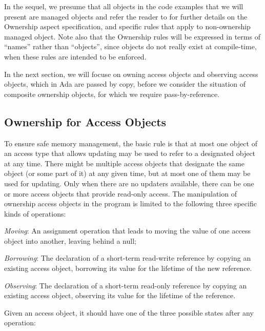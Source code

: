 \documentclass{llncs}
\begin{document}
In the sequel, we presume that all objects in the code examples that we will present are managed objects and refer the reader to \cite{AI2017} for further details on
the Ownership aspect specification, and specific rules that apply to non-ownership managed object. Note also that the Ownership rules will be expressed in terms
of ``names'' rather than ``objects'', since objects do not really exist at compile-time, when these rules are intended to be enforced. 

In the next section, we will focuse on owning access objects and observing access objects, which in Ada are passed by copy, before we
consider the situation of composite ownership objects, for which we require pass-by-reference.


\subsection{Ownership for Access Objects}
\label{subsec:ownershipAccess}

To ensure safe memory management, the basic rule is that at most one object of an access type that allows updating may be used to refer to a designated object at any time.  There might be multiple access objects that designate the same object (or some part of it) at any given time, but at most one of them may be used for updating.  Only when there are no updaters available, there can be one or more access objects that provide read-only access. The manipulation of ownership access objects in the program is limited to the following three specific kinds of operations:

\begin{compactitem}
  \item \textit{Moving}: An assignment operation that leads to moving the value of one access object into another, leaving behind a null;
  \item \textit{Borrowing}: The declaration of a short-term read-write reference by copying an existing access object, borrowing its value for the lifetime of the new reference. 
  \item \textit{Observing}: The declaration of a short-term read-only reference by copying an existing access object, observing its value for the lifetime of the reference. 
\end{compactitem}

Given an access object, it should have one of the three possible states after any operation:
\end{document}
